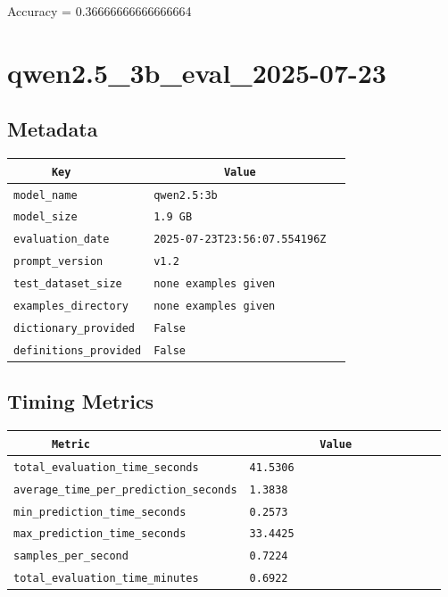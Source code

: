 \documentclass{article}
\begin{document}
\begin{center}
Accuracy = 0.36666666666666664
\end{center}

\section{qwen2.5\_3b\_eval\_2025-07-23}
\subsection{Metadata}

\begin{center}
\begin{tabular}{l | l} \hline
    \verb|      Key      | & \verb|           Value           | \\ \hline
    \hline
    \verb|model_name    | & \verb|qwen2.5:3b                   | \\ \hline
    \verb|model_size    | & \verb|1.9 GB                       | \\ \hline
    \verb|evaluation_date| & \verb|2025-07-23T23:56:07.554196Z  | \\ \hline
    \verb|prompt_version| & \verb|v1.2                         | \\ \hline
    \verb|test_dataset_size| & \verb|none examples given          | \\ \hline
    \verb|examples_directory| & \verb|none examples given          | \\ \hline
    \verb|dictionary_provided| & \verb|False                        | \\ \hline
    \verb|definitions_provided| & \verb|False                        | \\ \hline
\end{tabular}
\end{center}

\subsection{Timing Metrics}

\begin{center}
\begin{tabular}{l | l} \hline
    \verb|      Metric     | & \verb|           Value           | \\ \hline
    \hline
    \verb|total_evaluation_time_seconds| & \verb|41.5306                      | \\ \hline
    \verb|average_time_per_prediction_seconds| & \verb|1.3838                       | \\ \hline
    \verb|min_prediction_time_seconds| & \verb|0.2573                       | \\ \hline
    \verb|max_prediction_time_seconds| & \verb|33.4425                      | \\ \hline
    \verb|samples_per_second| & \verb|0.7224                       | \\ \hline
    \verb|total_evaluation_time_minutes| & \verb|0.6922                       | \\ \hline
\end{tabular}
\end{center}
\end{document}

